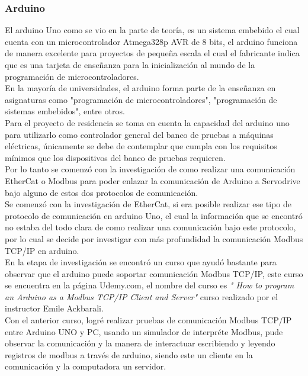 \documentclass[12pt,titlepage]{article}
\begin{document}
\subsubsection{Arduino}
El arduino Uno como se vio en la parte de teoría, es un sistema embebido el cual cuenta con un microcontrolador Atmega328p AVR de 8 bits, el arduino funciona de manera excelente para proyectos de pequeña escala el cual el fabricante indica que es una tarjeta de enseñanza para la  inicialización al mundo de la programación de microcontroladores. \\ 

En la mayoría de universidades, el arduino forma parte de la enseñanza en asignaturas como "programación de microcontroladores", "programación de sistemas embebidos", entre otros. \\

Para el proyecto de residencia se toma en cuenta la capacidad del arduino uno para utilizarlo como controlador general del banco de pruebas a máquinas eléctricas, únicamente se debe de contemplar que cumpla con los requisitos mínimos que los dispositivos del banco de pruebas requieren. \\

Por lo tanto se comenzó con la investigación de como realizar una comunicación EtherCat o Modbus para poder enlazar la comunicación de Arduino a Servodrive bajo alguno de estos dos protocolos de comunicación. \\ 

Se comenzó con la investigación de EtherCat, si era posible realizar ese tipo de protocolo de comunicación en arduino Uno, el cual la información que se encontró no estaba del todo clara de como realizar una comunicación bajo este protocolo, por lo cual se decide por investigar con más profundidad la comunicación Modbus TCP/IP en arduino. \\ 

En la etapa de investigación se encontró un curso que ayudó bastante para observar que el arduino puede soportar comunicación Modbus TCP/IP, este curso se encuentra en la página Udemy.com, el nombre del curso es \textit{" How to program an Arduino as a Modbus TCP/IP Client and Server"} curso realizado por el instructor Emile Ackbarali. \\

Con el anterior curso, logré realizar pruebas de comunicación Modbus TCP/IP entre Arduino UNO y PC, usando un simulador de interpréte Modbus, pude observar la comunicación y la manera de interactuar escribiendo y leyendo registros de modbus a través de arduino, siendo este un cliente en la comunicación y la computadora un servidor. \\
\end{document}
